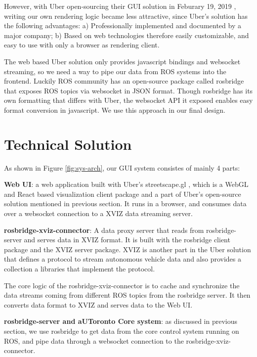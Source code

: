 \documentclass{article}
\begin{document}
However, with Uber open-sourcing their GUI solution in Feburary 19, 2019 \cite{ubernews}, writing our own rendering logic became less attractive, since Uber's solution has the following advantages: a) Professionally implemented and documented by a major company; b) Based on web technologies therefore easily customizable, and easy to use with only a browser as rendering client.

The web based Uber solution only provides javascript bindings and websocket streaming, so we need a way to pipe our data from ROS systems into the frontend. Luckily ROS community has an open-source package called rosbridge \cite{rosbridge} that exposes ROS topics via websocket in JSON format. Though rosbridge has its own formatting that differs with Uber, the websocket API it exposed enables easy format conversion in javascript. We use this approach in our final design.

\section{Technical Solution}

As shown in Figure \ref{fig:sys-arch}, our GUI system consistes of mainly 4 parts:

\textbf{Web UI}: a web application built with Uber's streetscape.gl \cite{streetscapegl}, which is a WebGL and React based visualization client package and a part of Uber's open-source solution mentioned in previous section. It runs in a browser, and consumes data over a websocket connection to a XVIZ data streaming server. 

\textbf{rosbridge-xviz-connector}: A data proxy server that reads from rosbridge-server and serves data in XVIZ format. It is built with the rosbridge client package and the XVIZ server package. XVIZ is another part in the Uber solution that defines a protocol to stream autonomous vehicle data and also provides a collection a libraries that implement the protocol.

The core logic of the rosbridge-xviz-connector is to cache and synchronize the data streams coming from different ROS topics from the rosbridge server. It then converts data format to XVIZ and serves data to the Web UI.

\textbf{rosbridge-server and aUToronto Core system}: as discussed in previous section, we use rosbridge to get data from the core control system running on ROS, and pipe data through a websocket connection to the rosbridge-xviz-connector.
\end{document}
